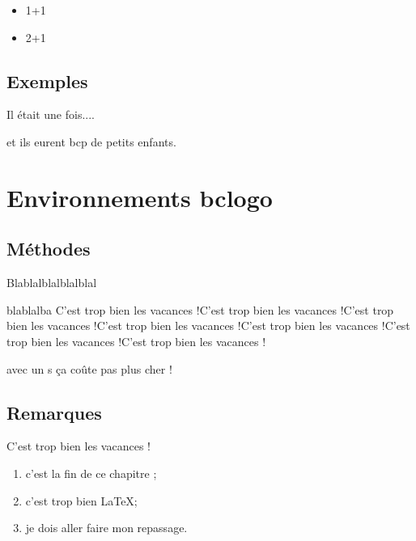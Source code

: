 \documentclass[french,10pt]{book}
\begin{document}
\begin{Demo}[s]
\begin{itemize}
\item 1+1
\item 2+1
\end{itemize}
\end{Demo}

\subsection{Exemples}
\begin{Exemple}
Il était une fois....
\par et ils eurent bcp de petits enfants.
\end{Exemple}



\section{Environnements bclogo}

\subsection{Méthodes}
\begin{Methode}
Blablalblalblalblal
\par blablalba C'est trop bien les vacances !C'est trop bien les vacances !C'est trop bien les vacances !C'est trop bien les vacances !C'est trop bien les vacances !C'est trop bien les vacances !C'est trop bien les vacances !
\end{Methode}

\begin{Methode}[s]
avec un s ça coûte pas plus cher !
\end{Methode}

\subsection{Remarques}

\begin{Rmq}
    C'est trop bien les vacances !
\end{Rmq}

\begin{Rmq}[s]
    \begin{enumerate}
        \item c'est la fin de ce chapitre ;
        \item c'est trop bien \LaTeX ;
        \item je dois aller faire mon repassage.
    \end{enumerate}
\end{Rmq}
\end{document}

